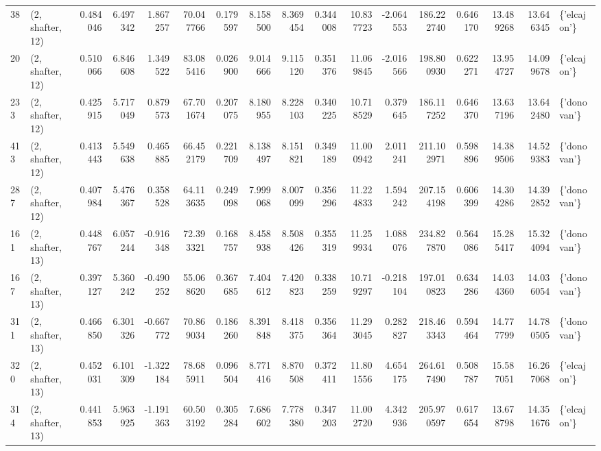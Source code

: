 \begin{tabular}{llrrrrrrrrrrrrrrl}
38  &  (2, shafter, 12) &   0.484046 &   6.497342 &   1.867257 &    70.047766 &   0.179597 &   8.158500 &   8.369454 &  0.344008 &  10.837723 &  -2.064553 &   186.222740 &   0.646170 &  13.489268 &  13.646345 &  \{'elcajon'\} \\
20  &  (2, shafter, 12) &   0.510066 &   6.846608 &   1.349522 &    83.085416 &   0.026900 &   9.014666 &   9.115120 &  0.351376 &  11.069845 &  -2.016566 &   198.800930 &   0.622271 &  13.954727 &  14.099678 &  \{'elcajon'\} \\
233 &  (2, shafter, 12) &   0.425915 &   5.717049 &   0.879573 &    67.701674 &   0.207075 &   8.180955 &   8.228103 &  0.340225 &  10.718529 &   0.379645 &   186.117252 &   0.646370 &  13.637196 &  13.642480 &  \{'donovan'\} \\
413 &  (2, shafter, 12) &   0.413443 &   5.549638 &   0.465885 &    66.452179 &   0.221709 &   8.138497 &   8.151821 &  0.349189 &  11.000942 &   2.011241 &   211.102971 &   0.598896 &  14.389506 &  14.529383 &  \{'donovan'\} \\
287 &  (2, shafter, 12) &   0.407984 &   5.476367 &   0.358528 &    64.113635 &   0.249098 &   7.999068 &   8.007099 &  0.356296 &  11.224833 &   1.594242 &   207.154198 &   0.606399 &  14.304286 &  14.392852 &  \{'donovan'\} \\
161 &  (2, shafter, 13) &   0.448767 &   6.057244 &  -0.916348 &    72.393321 &   0.168757 &   8.458938 &   8.508426 &  0.355319 &  11.259934 &   1.088076 &   234.827870 &   0.564086 &  15.285417 &  15.324094 &  \{'donovan'\} \\
167 &  (2, shafter, 13) &   0.397127 &   5.360242 &  -0.490252 &    55.068620 &   0.367685 &   7.404612 &   7.420823 &  0.338259 &  10.719297 &  -0.218104 &   197.010823 &   0.634286 &  14.034360 &  14.036054 &  \{'donovan'\} \\
311 &  (2, shafter, 13) &   0.466850 &   6.301326 &  -0.667772 &    70.869034 &   0.186260 &   8.391848 &   8.418375 &  0.356364 &  11.293045 &   0.282827 &   218.463343 &   0.594464 &  14.777799 &  14.780505 &  \{'donovan'\} \\
320 &  (2, shafter, 13) &   0.452031 &   6.101309 &  -1.322184 &    78.685911 &   0.096504 &   8.771416 &   8.870508 &  0.372411 &  11.801556 &   4.654175 &   264.617490 &   0.508787 &  15.587051 &  16.267068 &  \{'elcajon'\} \\
314 &  (2, shafter, 13) &   0.441853 &   5.963925 &  -1.191363 &    60.503192 &   0.305284 &   7.686602 &   7.778380 &  0.347203 &  11.002720 &   4.342936 &   205.970597 &   0.617654 &  13.678798 &  14.351676 &  \{'elcajon'\} \\

\end{tabular}
